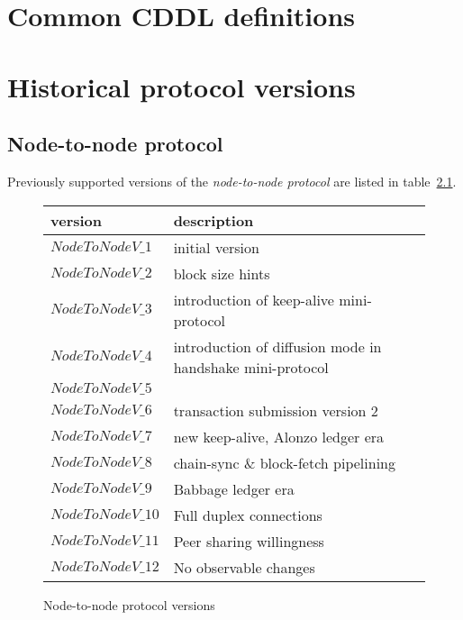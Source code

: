 \documentclass{report}
\begin{document}
\appendix

\chapter{Common CDDL definitions}
\label{cddl-common}


\chapter{Historical protocol versions}
\label{historical-protocol-versions}

\section{Node-to-node protocol}
Previously supported versions of the \textit{node-to-node protocol} are listed
in table~\ref{table:historical-node-to-node-protocol-versions}.
\begin{figure}[h]
  \begin{center}
    \begin{tabular}{l|l}
      version         & description \\\hline\hline
      $NodeToNodeV\_1$ & initial version \\\hline
      $NodeToNodeV\_2$ & block size hints \\\hline
      $NodeToNodeV\_3$ & introduction of keep-alive mini-protocol \\\hline
      $NodeToNodeV\_4$ & introduction of diffusion mode in handshake mini-protocol \\\hline
      $NodeToNodeV\_5$ & \\\hline
      $NodeToNodeV\_6$ & transaction submission version 2 \\\hline
      $NodeToNodeV\_7$ & new keep-alive, Alonzo ledger era \\\hline
      $NodeToNodeV\_8$ & chain-sync \& block-fetch pipelining \\\hline
      $NodeToNodeV\_9$ & Babbage ledger era \\\hline
      $NodeToNodeV\_10$ & Full duplex connections \\\hline
      $NodeToNodeV\_11$ & Peer sharing willingness \\\hline
      $NodeToNodeV\_12$ & No observable changes \\\hline
    \end{tabular}
    \caption{Node-to-node protocol versions}
    \label{table:historical-node-to-node-protocol-versions}
  \end{center}
\end{figure}
\end{document}

